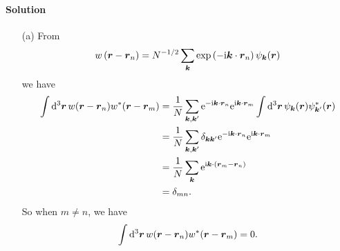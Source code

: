 \documentclass[hyperref, a4paper]{article}
\newcommand*{\ii}{\mathrm{i}}
\newcommand*{\ee}{\mathrm{e}}
\begin{document}
\paragraph{Solution}  \begin{itemize}
\item[(a)] From 
\begin{equation}
    w\left(\vb*{r}-\vb*{r}_n\right)=N^{-1 / 2} \sum_{\vb*{k}} \exp \left(- \ii \vb*{k} \cdot \vb*{r}_n\right) \psi_{\vb*{k}}(\vb*{r})
\end{equation}
we have 
\[
    \begin{aligned}
        \int \dd[3]{\vb*{r}} w(\vb*{r} - \vb*{r}_n) w^*(\vb*{r} - \vb*{r}_m)
        &= \frac{1}{N} \sum_{\vb*{k}, \vb*{k}'} 
        \ee^{- \ii \vb*{k} \cdot \vb*{r}_n} \ee^{\ii \vb*{k} \cdot \vb*{r}_m}
        \int \dd[3]{\vb*{r}} \psi_{\vb*{k}}(\vb*{r}) \psi_{\vb*{k}'}^*(\vb*{r}) \\
        &= \frac{1}{N} \sum_{\vb*{k}, \vb*{k}'} \delta_{\vb*{k} \vb*{k}'} 
        \ee^{- \ii \vb*{k} \cdot \vb*{r}_n} \ee^{\ii \vb*{k} \cdot \vb*{r}_m} \\
        &= \frac{1}{N} \sum_{\vb*{k}} \ee^{\ii \vb*{k} \cdot (\vb*{r}_m - \vb*{r}_n)} \\
        &= \delta_{mn}.
    \end{aligned}
\]
So when $m \neq n$, we have 
\begin{equation}
    \int \dd[3]{\vb*{r}} w(\vb*{r} - \vb*{r}_n) w^*(\vb*{r} - \vb*{r}_m) = 0.
\end{equation}


\end{itemize}
\end{document}
